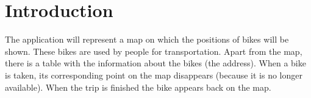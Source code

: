 \section{Introduction}

The application will represent a map on which the positions of bikes will be shown. These bikes are used by people
for transportation. Apart from the map, there is a table with the information about the bikes (the address). When a bike is taken, its corresponding point on the map disappears (because it is no longer available). When the trip is finished the bike appears back on the map. 